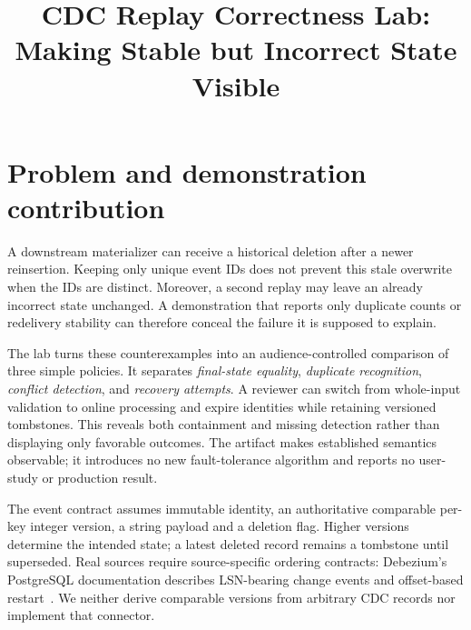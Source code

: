 \documentclass[sigconf,9pt]{acmart}
\title{CDC Replay Correctness Lab: Making Stable but Incorrect State Visible}
\begin{document}
\maketitle
\section{Problem and demonstration contribution}
A downstream materializer can receive a historical deletion after a newer reinsertion.
Keeping only unique event IDs does not prevent this stale overwrite when the IDs
are distinct. Moreover, a second replay may leave an already incorrect state unchanged.
A demonstration that reports only duplicate counts or redelivery stability can
therefore conceal the failure it is supposed to explain.

The lab turns these counterexamples into an audience-controlled comparison of three
simple policies. It separates \emph{final-state equality}, \emph{duplicate recognition},
\emph{conflict detection}, and \emph{recovery attempts}. A reviewer can switch from
whole-input validation to online processing and expire identities while retaining
versioned tombstones. This reveals both containment and missing detection rather
than displaying only favorable outcomes. The artifact makes established semantics
observable; it introduces no new fault-tolerance algorithm and reports no user-study
or production result.

The event contract assumes immutable identity, an authoritative comparable per-key
integer version, a string payload and a deletion flag. Higher versions determine the
intended state; a latest deleted record remains a tombstone until superseded. Real sources require source-specific
ordering contracts: Debezium's PostgreSQL documentation describes LSN-bearing change
events and offset-based restart~\cite{debezium}. We neither derive comparable versions
from arbitrary CDC records nor implement that connector.
\end{document}
